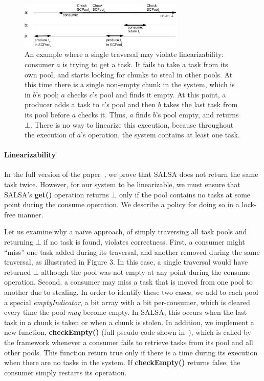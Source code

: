 \begin{figure}[htb]
	\centering
	\includegraphics[width=0.7\textwidth]{figures/linearizability-example}
	\vspace{-10pt}
	\caption{\footnotesize{An example where a single traversal may violate linearizability: consumer $a$ is trying to get a task. It fails to take a task from its own pool, and starts looking for chunks to steal in other pools. At this time there is a single non-empty chunk in the system, which is in $b$'s pool; $a$ checks $c$'s pool and finds it empty. At this point, a producer adds a task to $c$'s pool and then $b$ takes the last task from its pool before $a$ checks it. Thus, $a$ finds $b$'s pool empty, and returns $\bot$. There is no way to linearize this execution, because throughout the execution of $a$'s operation, the system contains at least one task.}}
	\vspace{-5pt}
	\label{fig:linearizability-example}
\end{figure}

\paragraph{Linearizability}
In the full version of the paper~\cite{salsa-tech-rep}, we prove that SALSA does not return the same task twice. However, for our system to be linearizable, we must ensure that SALSA's {\bf get()} operation returns $\bot$ only if the pool contains no tasks at some point during the consume operation. We describe a policy for doing so in a lock-free manner. 

Let us examine why a na\"ive approach, of simply traversing all task pools and returning $\bot$ if no task is found, violates correctness. First, a consumer might ``miss'' one task added during its traversal, and another removed during the same traversal, as illustrated in Figure 3. In this case, a single traversal would have returned $\bot$ although the pool was not empty at any point during the consume operation. Second, a consumer may miss a task that is moved from one pool to another due to stealing. In order to identify these two cases, we add to each pool a special \emph{emptyIndicator}, a bit array with a bit per-consumer, which is cleared every time the pool \emph{may} become empty. In SALSA, this occurs when the last task in a chunk is taken or when a chunk is stolen. 
In addition, we implement a new function, {\bf checkEmpty()} (full pseudo-code shown in~\cite{salsa-tech-rep}), which is called by the framework whenever a consumer fails to retrieve tasks from its pool and all other pools. This function return true only if there is a time during its execution when there are no tasks in the system. If {\bf checkEmpty()} returns false, the consumer simply restarts its operation. 

